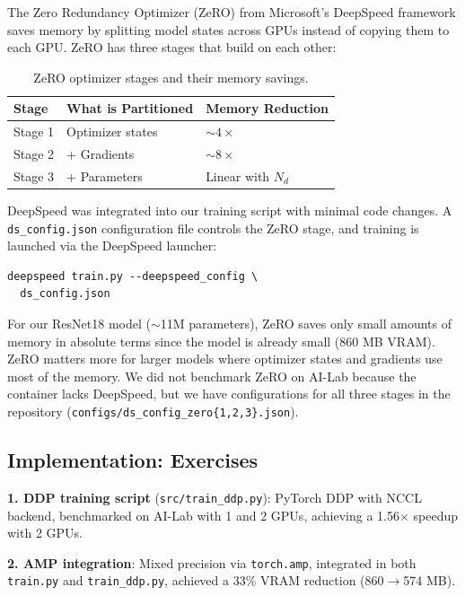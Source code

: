 \documentclass[10pt,twocolumn,letterpaper]{article}
\begin{document}
The Zero Redundancy Optimizer (ZeRO) from Microsoft's DeepSpeed framework saves memory by splitting model states across GPUs instead of copying them to each GPU. ZeRO has three stages that build on each other:

\begin{table}[h]
\centering
\caption{ZeRO optimizer stages and their memory savings.}
\label{tab:zero}
\begin{tabular}{@{} l l l @{}}
\toprule
\textbf{Stage} & \textbf{What is Partitioned} & \textbf{Memory Reduction} \\
\midrule
Stage 1 & Optimizer states & $\sim 4\times$ \\
Stage 2 & + Gradients & $\sim 8\times$ \\
Stage 3 & + Parameters & Linear with $N_{d}$ \\
\bottomrule
\end{tabular}
\end{table}

DeepSpeed was integrated into our training script with minimal code changes. A \texttt{ds\_config.json} configuration file controls the ZeRO stage, and training is launched via the DeepSpeed launcher:

\begin{verbatim}
deepspeed train.py --deepspeed_config \
  ds_config.json
\end{verbatim}

For our ResNet18 model ($\sim$11M parameters), ZeRO saves only small amounts of memory in absolute terms since the model is already small (860 MB VRAM). ZeRO matters more for larger models where optimizer states and gradients use most of the memory. We did not benchmark ZeRO on AI-Lab because the container lacks DeepSpeed, but we have configurations for all three stages in the repository (\texttt{configs/ds\_config\_zero\{1,2,3\}.json}).

\subsection{Implementation: Exercises}

\textbf{1. DDP training script} (\texttt{src/train\_ddp.py}): PyTorch DDP with NCCL backend, benchmarked on AI-Lab with 1 and 2 GPUs, achieving a 1.56$\times$ speedup with 2 GPUs.

\textbf{2. AMP integration}: Mixed precision via \texttt{torch.amp}, integrated in both \texttt{train.py} and \texttt{train\_ddp.py}, achieved a 33\% VRAM reduction (860$\to$574 MB).
\end{document}
